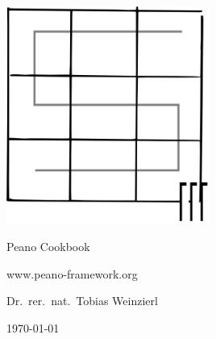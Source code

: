
\begin{titlepage}

  \begin{center}

    \vspace{4cm}
  
    \includegraphics[width=0.5\textwidth]{logo.png}
 
    \vspace{1.5cm}

    {\Huge
      Peano Cookbook
    }
   
    \vspace{1cm}

     www.peano-framework.org
     
    \vspace{1.5cm}

     Dr.~rer.~nat.~Tobias Weinzierl
 
    \vspace{1.5cm}

    \today
  \end{center}


\end{titlepage}
